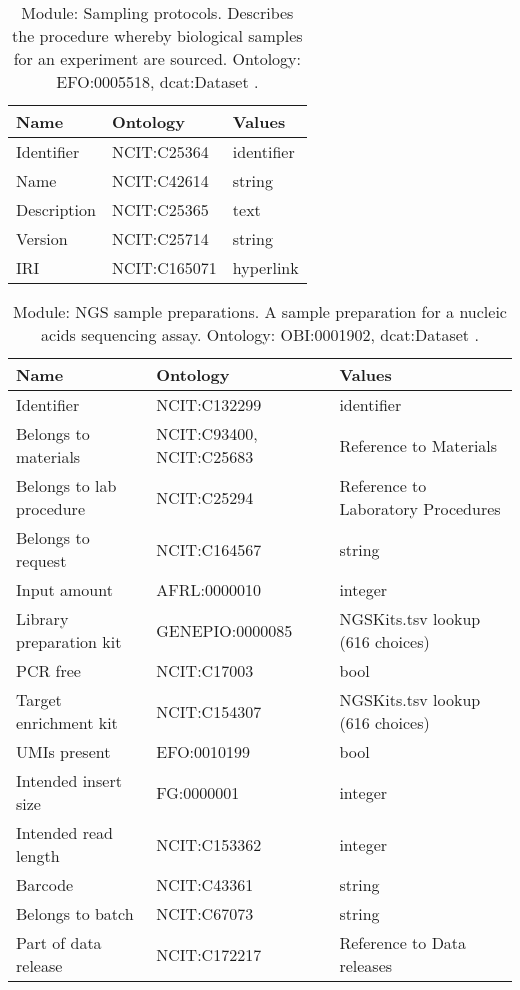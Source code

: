 \documentclass{article}
\begin{document}
\begin{table}[htb]
\begin{tabular}{lll}
Name & Ontology & Values \\
\hline
Identifier & NCIT:C25364  & identifier \\
Name & NCIT:C42614  & string \\
Description & NCIT:C25365  & text \\
Version & NCIT:C25714  & string \\
IRI & NCIT:C165071  & hyperlink \\
\hline
\end{tabular}
\caption[Module: Sampling protocols]{\label{table:table8} Module: Sampling protocols. Describes the procedure whereby biological samples for an experiment are sourced. Ontology: EFO:0005518, dcat:Dataset . }
\end{table}

\begin{table}[htb]
\begin{tabular}{lll}
Name & Ontology & Values \\
\hline
Identifier & NCIT:C132299  & identifier \\
Belongs to materials & NCIT:C93400, NCIT:C25683  & Reference to Materials \\
Belongs to lab procedure & NCIT:C25294  & Reference to Laboratory Procedures \\
Belongs to request & NCIT:C164567  & string \\
Input amount & AFRL:0000010  & integer \\
Library preparation kit & GENEPIO:0000085  & NGSKits.tsv lookup (616 choices) \\
PCR free & NCIT:C17003  & bool \\
Target enrichment kit & NCIT:C154307  & NGSKits.tsv lookup (616 choices) \\
UMIs present & EFO:0010199  & bool \\
Intended insert size & FG:0000001  & integer \\
Intended read length & NCIT:C153362  & integer \\
Barcode & NCIT:C43361  & string \\
Belongs to batch & NCIT:C67073  & string \\
Part of data release & NCIT:C172217  & Reference to Data releases \\
\hline
\end{tabular}
\caption[Module: NGS sample preparations]{\label{table:table9} Module: NGS sample preparations. A sample preparation for a nucleic acids sequencing assay. Ontology: OBI:0001902, dcat:Dataset . }
\end{table}
\end{document}
